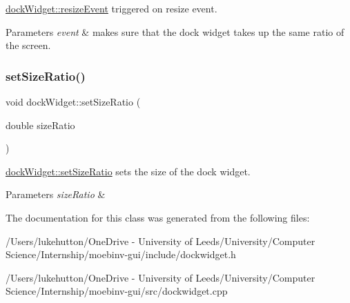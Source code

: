 \mbox{\hyperlink{classdock_widget_ae9cc3b91f10ee2af70fd74c6422848b6}{dock\+Widget\+::resize\+Event}} triggered on resize event. 


\begin{DoxyParams}{Parameters}
{\em event} & makes sure that the dock widget takes up the same ratio of the screen. \\
\hline
\end{DoxyParams}
\mbox{\label{classdock_widget_a7f6a50274259d918d9a9068b8a94fe80}} 
\subsubsection{\texorpdfstring{set\+Size\+Ratio()}{setSizeRatio()}}
{\footnotesize\ttfamily void dock\+Widget\+::set\+Size\+Ratio (\begin{DoxyParamCaption}\item[{double}]{size\+Ratio }\end{DoxyParamCaption})}



\mbox{\hyperlink{classdock_widget_a7f6a50274259d918d9a9068b8a94fe80}{dock\+Widget\+::set\+Size\+Ratio}} sets the size of the dock widget. 


\begin{DoxyParams}{Parameters}
{\em size\+Ratio} & \\
\hline
\end{DoxyParams}


The documentation for this class was generated from the following files\+:\begin{DoxyCompactItemize}
\item 
/\+Users/lukehutton/\+One\+Drive -\/ University of Leeds/\+University/\+Computer Science/\+Internship/moebinv-\/gui/include/dockwidget.\+h\item 
/\+Users/lukehutton/\+One\+Drive -\/ University of Leeds/\+University/\+Computer Science/\+Internship/moebinv-\/gui/src/dockwidget.\+cpp\end{DoxyCompactItemize}
